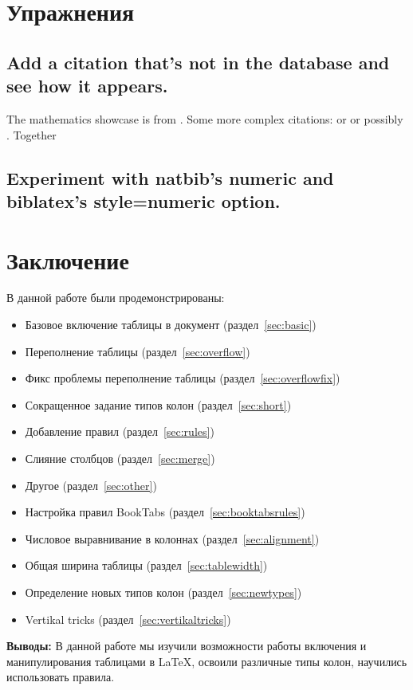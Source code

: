 \documentclass{article}
\begin{document}
  \smallskip


  











  \section{Упражнения}
  \label{sec:ex}

  \subsection{Add a citation that’s not in the database and see how it appears.}
  \label{subsec:width}

\begin{center}
The mathematics showcase is from \autocite{Graham1995}.
Some more complex citations: \parencite{Graham1995} or
\textcite{checkMissingCite} or possibly .
\autocite[56]{Thomas2008}
\autocite[See][45-48]{Graham1995}
Together \autocite{Thomas2008,Graham1995}
\printbibliography
\end{center}



  \subsection{Experiment with natbib’s numeric and biblatex’s style=numeric option.}
  \label{subsec:width}

  
  \section{Заключение}
  \label{sec:conclusion}
  
  В данной работе были продемонстрированы:
  \begin{itemize}
    \item Базовое включение таблицы в документ (раздел~\ref{sec:basic})
    \item Переполнение таблицы (раздел~\ref{sec:overflow})
    \item Фикс проблемы переполнение таблицы (раздел~\ref{sec:overflowfix})
    \item Сокращенное задание типов колон (раздел~\ref{sec:short})
    \item Добавление правил (раздел~\ref{sec:rules})
    \item Слияние столбцов (раздел~\ref{sec:merge})
    \item Другое (раздел~\ref{sec:other})
    \item Настройка правил BookTabs (раздел~\ref{sec:booktabsrules})
    \item Числовое выравнивание в колоннах (раздел~\ref{sec:alignment})
    \item Общая ширина таблицы (раздел~\ref{sec:tablewidth})
    \item Определение новых типов колон (раздел~\ref{sec:newtypes})
    \item Vertikal tricks (раздел~\ref{sec:vertikaltricks})
  \end{itemize}

  \textbf{Выводы:} В данной работе мы изучили возможности работы включения и манипулирования таблицами в LaTeX, освоили различные типы колон, научились использовать правила.
\end{document}
